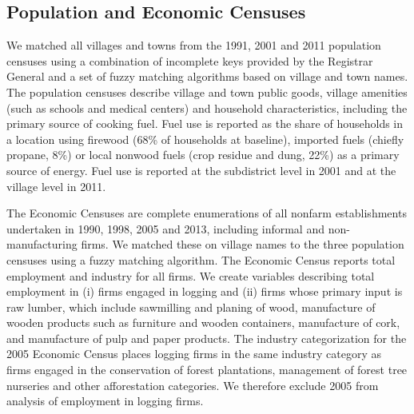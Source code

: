 \subsection{Population and Economic Censuses}

We matched all villages and towns from the 1991, 2001 and 2011
population censuses using a combination of incomplete keys provided by
the Registrar General and a set of fuzzy matching algorithms based on
village and town names. The population censuses describe village and
town public goods, village amenities (such as schools and medical
centers) and household characteristics, including the primary source
of cooking fuel. Fuel use is reported as the share of households in a
location using firewood (68\% of households at baseline), imported
fuels (chiefly propane, 8\%) or local nonwood fuels (crop residue and
dung, 22\%) as a primary source of energy. Fuel use is reported at the
subdistrict level in 2001 and at the village level in 2011.

The Economic Censuses are complete enumerations of all nonfarm
establishments undertaken in 1990, 1998, 2005 and 2013, including
informal and non-manufacturing firms. We matched these on village
names to the three population censuses using a fuzzy matching
algorithm. The Economic Census reports total employment and industry
for all firms. We create variables describing total employment in (i)
firms engaged in logging and (ii) firms whose primary input is raw
lumber, which include sawmilling and planing of wood, manufacture of
wooden products such as furniture and wooden containers, manufacture
of cork, and manufacture of pulp and paper products. The industry
categorization for the 2005 Economic Census places logging firms in
the same industry category as firms engaged in the conservation of
forest plantations, management of forest tree nurseries and other
afforestation categories. We therefore exclude 2005 from analysis of
employment in logging firms.
